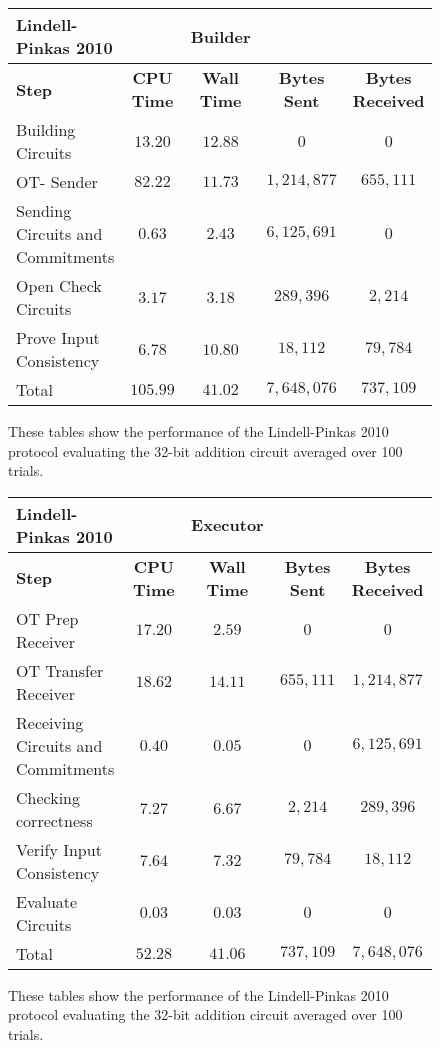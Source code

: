 \documentclass[ %
                    author={Nicholas Tutte},
                supervisor={Prof. Nigel Smart},
                    degree={MEng},
                     title={Secure Two Party Computation},
                  subtitle={A practical comparison of recent protocols},
                      type={Research - GG1K},
                      year={2015} ]{dissertation}
\begin{document}
				\begin{figure}[!h]
					\begin{tabular}{| p{3.5cm} | c c c c |}
						\hline
						\textbf{Lindell-Pinkas 2010} & & \textbf{Builder} & & \\
						\hline
						\textbf{Step} & \textbf{CPU Time} & \textbf{Wall Time} & \textbf{Bytes Sent} & \textbf{Bytes Received} \\
						\thickhline
						Building Circuits & $13.20$ & $12.88$ & $0$ & $0$ \\
						\hline
						OT- Sender & $82.22$ & $11.73$ & $1,214,877$ & $655,111$ \\
						\hline
						Sending Circuits and Commitments & $0.63$ & $2.43$ & $6,125,691$ & $0$ \\
						\hline
						Open Check Circuits & $3.17$ & $3.18$ & $289,396$ & $2,214$ \\
						\hline
						Prove Input Consistency & $6.78$ & $10.80$ & $18,112$ & $79,784$ \\
						\thickhline
						Total & $105.99$ & $41.02$ & $7,648,076$ & $737,109$ \\
						\hline
					\end{tabular}
					\caption{These tables show the performance of the Lindell-Pinkas 2010 protocol evaluating the 32-bit addition circuit averaged over 100 trials.\label{table:LP_2010_Add_Builder}}
				\end{figure}
					
				\begin{figure}
					\begin{tabular}{| p{3.5cm} | c c c c |}
						\hline
						\textbf{Lindell-Pinkas 2010} & & \textbf{Executor} & & \\
						\hline
						\textbf{Step} & \textbf{CPU Time} & \textbf{Wall Time} & \textbf{Bytes Sent} & \textbf{Bytes Received} \\
						\thickhline
						OT Prep Receiver & $17.20$ & $2.59$ & $0$ & $0$ \\
						\hline
						OT Transfer Receiver & $18.62$ & $14.11$ & $655,111$ & $1,214,877$ \\
						\hline
						Receiving Circuits and Commitments & $0.40$ & $0.05$ & $0$ & $6,125,691$ \\
						\hline
						Checking correctness & $7.27$ & $6.67$  & $2,214$ & $289,396$\\
						\hline
						Verify Input Consistency & $7.64$ & $7.32$ & $79,784$ & $18,112$ \\
						\hline
						Evaluate Circuits & $0.03$ & $0.03$ & $0$ & $0$ \\
						\thickhline
						Total & $52.28$ & $41.06$ & $737,109$ & $7,648,076$ \\
						\hline
					\end{tabular}
					\caption{These tables show the performance of the Lindell-Pinkas 2010 protocol evaluating the 32-bit addition circuit averaged over 100 trials.\label{table:LP_2010_Add_Executor}}
				\end{figure}
\end{document}
